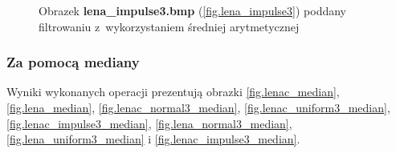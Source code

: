 \documentclass{classrep}
\begin{document}
\begin{figure}
{{  \label{fig.lena_impulse3_average_5x5}
 }
}
\caption{Obrazek \textbf{lena\_impulse3.bmp} (\ref{fig.lena_impulse3}) poddany filtrowaniu z~wykorzystaniem średniej arytmetycznej}
\label{fig.lena_impulse3_average}
\end{figure}

\subsubsection{Za pomocą mediany}
Wyniki wykonanych operacji prezentują obrazki \ref{fig.lenac_median}, \ref{fig.lena_median}, \ref{fig.lenac_normal3_median}, \ref{fig.lenac_uniform3_median}, \ref{fig.lenac_impulse3_median}, \ref{fig.lena_normal3_median}, \ref{fig.lena_uniform3_median} i \ref{fig.lenac_impulse3_median}.

\end{document}
